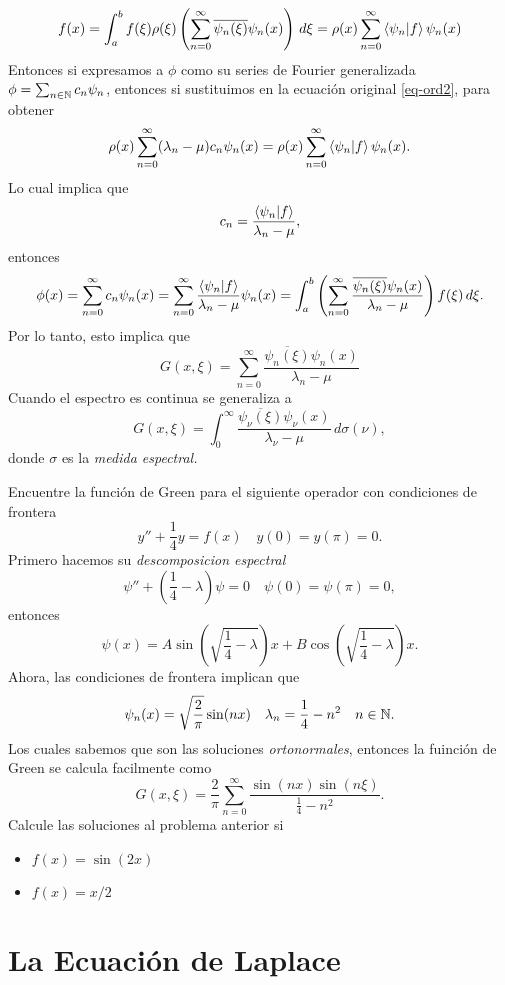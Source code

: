 \documentclass[main.tex]{subfiles}
\begin{document}
\begin{equation}
  f(x)=\int_{a}^{b}f(\xi)\rho(\xi)\left(\sum_{n=0}^{\infty}\overline{\psi_{n}(\xi)}\psi_{n}(x)\right)\,d\xi=\rho(x)\sum_{n=0}^{\infty}\braket{\psi_{n}|f}\psi_{n}(x)
\end{equation}
Entonces si expresamos a $\phi$ como su series de Fourier generalizada $\phi=\sum_{n\in \mathbb N }c_{n}\psi_{n}$, entonces si sustituimos en la ecuación original \ref{eq-ord2}, para obtener
\begin{equation}
\rho(x)\sum_{n=0}^{\infty}(\lambda_{n}-\mu)c_{n}\psi_{n}(x)=\rho(x)\sum_{n=0}^{\infty}\braket{\psi_{n}|f}\psi_{n}(x).
\end{equation}
Lo cual implica que
\[
  c_{n}=\frac{\braket{\psi_{n}|f}}{\lambda_{n}-\mu},
\]
entonces
\[ \phi(x)=\sum_{n=0}^{\infty}c_{n}\psi_{n}(x)=\sum_{n=0}^{\infty}\frac{\braket{\psi_{n}|f}}{\lambda_{n}-\mu}\psi_{n}(x)=
  \int_{a}^{b}\left(\sum_{n=0}^{\infty}\frac{\overline{\psi_{n}(\xi)}\psi_{n}(x)}{\lambda_{n}-\mu}\right)f(\xi)\,d\xi.
\]
Por lo tanto, esto implica que
\[
  G(x,\xi)=\sum_{n=0}^{\infty}\frac{\overline{\psi_{n}(\xi)}\psi_{n}(x)}{\lambda_{n}-\mu}
\]
Cuando el espectro es continua se generaliza a
\[
  G(x,\xi)=\int_{0}^{\infty}\frac{\overline{\psi_{\nu}(\xi)}\psi_{\nu}(x)}{\lambda_{\nu}-\mu}\,d\sigma(\nu),
\]
donde $\sigma$ es la \emph{medida espectral.}

\eje Encuentre la función de Green para el siguiente operador con condiciones de frontera
\[
  y''+\frac{1}{4}y=f(x)\quad y(0)=y(\pi)=0.
\]
Primero hacemos su \emph{descomposicion espectral}
\[
  \psi''+\left(\frac{1}{4}-\lambda\right)\psi=0\quad \psi(0)=\psi(\pi)=0,
\]
entonces
\[
  \psi(x)=A\sin\left(\sqrt{\frac{1}{4}-\lambda}\right)x+B\cos\left(\sqrt{\frac{1}{4}-\lambda}\right)x.
\]
    Ahora, las condiciones de frontera implican que
\[
  \psi_{n}(x)=\sqrt{\frac{2}{\pi}}\sin(nx)\quad\lambda_{n}=\frac{1}{4}-n^{2}\quad n\in \mathbb N .
\]
Los cuales sabemos que son las soluciones \emph{ortonormales}, entonces la fuinción de Green se calcula facilmente como
\[
  G(x,\xi)=\frac{2}{\pi}\sum_{n=0}^{\infty}\frac{\sin(nx)\sin(n\xi)}{\frac{1}{4}-n^{2}}.
\]
\exe Calcule las soluciones al problema anterior si
\begin{itemize}
  \item $f(x)=\sin(2x)$
  \item $f(x)=x/2$
\end{itemize}

\section{La Ecuación de Laplace}
\end{document}
